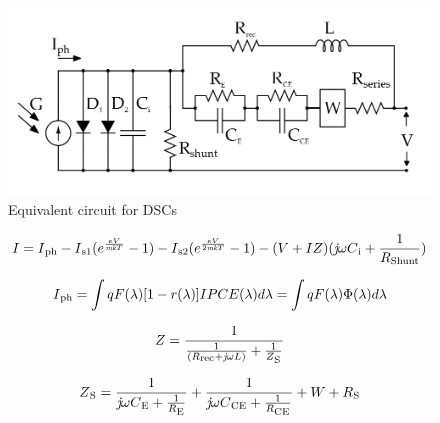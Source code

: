 { \begin{figure}[H]
  \begin{center}
	\includegraphics[width=1.0\linewidth]{images/dsc_eq_ckt}
	\caption{Equivalent circuit for DSCs  }
	\label{fig:dsc_eq_ckt}
  \end{center}
  \end{figure}

 \begin{equation}
  \begin{aligned}
    I = I\textsubscript{ph} -  I\textsubscript{s1} (e^{\frac{eV}{\textit{mk}T}}-1) - I\textsubscript{s2} (e^{\frac{eV}{2\textit{mk}T}}-1)- (V+IZ)(\textit{j}{\omega}C\textsubscript{i}+\frac{1}{R\textsubscript{Shunt}}) 
     \label{eq:equ_current_dSC}
  \end{aligned}
 \end{equation}
    
 \begin{equation}
  \begin{aligned}
     I\textsubscript{ph} =\int{qF(\lambda)[1-r(\lambda)]IPCE(\lambda)d\lambda} = \int{qF(\lambda)\Phi(\lambda)d\lambda}  
  \end{aligned}
 \end{equation}
 
  \begin{equation}
   \begin{aligned}
     Z={\dfrac{1}{{\frac{1}{(R\textsubscript{rec}+\textit{j}{\omega}L)}}+{\frac{1}{Z\textsubscript{S}}}}} 
   \end{aligned}
  \end{equation}
  
 \begin{equation}
   \begin{aligned}
    Z\textsubscript{S}={\dfrac{1}{{\textit{j}{\omega}C\textsubscript{E}}+{\frac{1}{R\textsubscript{E}}}}}+{\dfrac{1}{{\textit{j}{\omega}C\textsubscript{CE}}+{\frac{1}{R\textsubscript{CE}}}}}+W+R\textsubscript{S}
   \end{aligned}
  \end{equation}
  
}
